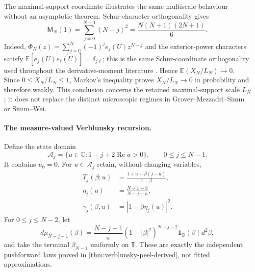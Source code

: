 The maximal-support coordinate illustrates the same multiscale behaviour without an
asymptotic theorem.  Schur-character orthogonality gives
\begin{equation}
 \mathsf M_N(1)=\sum_{j=0}^{N-1}(N-j)^2
 =\frac{N(N+1)(2N+1)}6.
 \label{eq:cueM-first-moment}
\end{equation}
Indeed,
$\Phi_N(z)=\sum_{j=0}^{N}(-1)^je_j(U)z^{N-j}$ and the exterior-power characters satisfy
$\mathbb E[e_j(U)\overline{e_\ell(U)}]=\delta_{j\ell}$; this is the same Schur-coordinate
orthogonality used throughout the derivative-moment literature
\cite{macdonald1995,dehaye2008,groverMezzadriSimm2026}.  Hence
$\mathbb E(X_N/L_N)\to0$.  Since $0\leq X_N/L_N\leq1$, Markov's inequality proves
$X_N/L_N\to0$ in probability and therefore weakly.  This conclusion concerns the retained
maximal-support scale $L_N$; it does not replace the distinct microscopic regimes in
Grover--Mezzadri--Simm or Simm--Wei.

\paragraph{The measure-valued Verblunsky recursion.}
Define the state domain
\begin{equation}
 \mathcal A_j=\{u\in\mathbb C:1-j+2\operatorname{Re}u>0\},
 \qquad 0\leq j\leq N-1.
 \label{eq:cueM-state-domain}
\end{equation}
It contains $u_0=0$.  For $u\in\mathcal A_j$ retain, without changing variables,
\begin{align}
 T_j(\beta;u)&=\frac{1+u-\beta(j-\overline u)}{1-\beta},
 \label{eq:cueM-T-state}\\
 \eta_j(u)&=\frac{N-1-\overline u}{N-j+u},
 \label{eq:cueM-eta-state}\\
 \gamma_j(\beta,u)&=|1-\beta\eta_j(u)|^2.
 \label{eq:cueM-gamma-state}
\end{align}
For $0\leq j\leq N-2$, let
\begin{equation}
 d\mu_{N-j-1}(\beta)=
 \frac{N-j-1}{\pi}(1-|\beta|^2)^{N-j-2}\mathbf1_{\mathbb D}(\beta)d^2\beta,
 \label{eq:cueM-beta-law}
\end{equation}
and take the terminal $\beta_{N-1}$ uniformly on $\mathbb T$.  These are exactly the
independent pushforward laws proved in
\cref{thm:verblunsky-peel-derived}, not fitted approximations.

